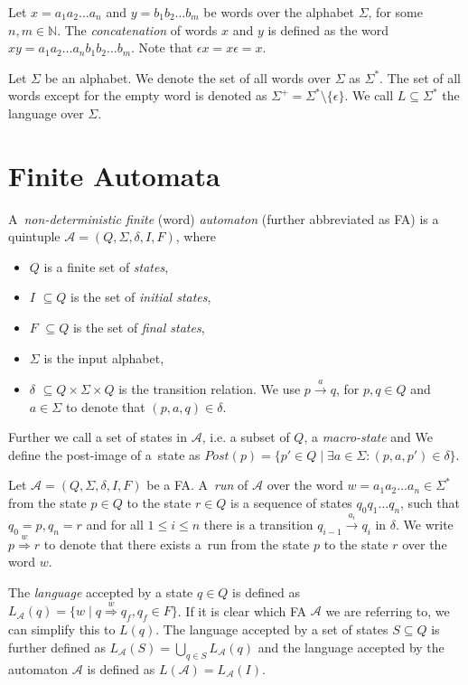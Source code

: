 Let $x = a_1a_2\ldots a_n$ and $y = b_1b_2\ldots b_m$ be words over the alphabet
$\Sigma$, for some $n, m \in \mathbb{N}$. The \emph{concatenation} of words $x$
and $y$ is defined as the word $xy = a_1a_2\ldots a_nb_1b_2\ldots b_m$. Note
that $\epsilon x = x \epsilon = x$.

Let $\Sigma$ be an alphabet. We denote the set of all words over $\Sigma$ as
$\Sigma^*$. The set of all words except for the empty word is denoted as
$\Sigma^+ = \Sigma^* \setminus \{\epsilon\}$. We call $L \subseteq \Sigma^*$ the
language over $\Sigma$.

 \section{Finite Automata}

 A~\emph{non-deterministic finite} (word) \emph{automaton} (further abbreviated
 as FA) is a quintuple $\mathcal{A} = (Q, \Sigma, \delta, I, F)$, where
  \begin{itemize}
\item $Q$ is a finite set of \emph{states}, \item $I$ $ \subseteq Q$ is the set
of \emph{initial states}, \item $F$ $ \subseteq Q$ is the set of \emph{final
states}, \item $\Sigma$ is the input alphabet, \item $\delta$ $ \subseteq Q
\times\Sigma\times Q$ is the transition relation. We use $p
\overset{a}{\longrightarrow} q$, for $p, q \in Q$ and $a \in \Sigma$ to denote
that $(p, a, q) \in \delta$.
	\end{itemize}
	
	Further we call a set of states in $\mathcal{A}$, i.e. a subset of $Q$, a
\emph{macro-state} and We define the post-image of a~state as
$Post(p) = \{p'\in Q \mid \exists a \in \Sigma: (p, a, p') \in \delta\}$.
	
Let $\mathcal{A} = (Q, \Sigma, \delta, I, F)$ be a FA. A~\emph{run} of
$\mathcal{A}$ over the word $w = a_1a_2\ldots a_n \in \Sigma^*$ from the state
$p \in Q$ to the state $r \in Q$ is a sequence of states $q_0q_1\ldots q_n$,
such that $q_0 = p, q_n = r$ and for all $1 \leq i \leq n$ there is a transition
$q_{i-1} \overset{a_i}{\longrightarrow} q_i$ in $\delta$. We write $p
\overset{w}{\Longrightarrow} r$ to denote that there exists a~run from the state
$p$ to the state $r$ over the word $w$.
	
The \emph{language} accepted by a state $q \in Q$ is defined as
$L_{\mathcal{A}}(q) = \{w \mid q \overset{w}{\Longrightarrow} q_f, q_f \in F\}$.
If it is clear which FA $\mathcal{A}$ we are referring to, we can simplify
this to $L(q)$. The language accepted by a set of states $S \subseteq
Q$ is further defined as $L_{\mathcal{A}}(S) = \bigcup_{q \in S}
L_{\mathcal{A}}(q)$ and the language accepted by the automaton $\mathcal{A}$ is
defined as $L(\mathcal{A}) = L_{\mathcal{A}}(I)$.
	
